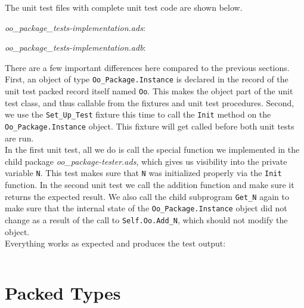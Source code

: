The unit test files with complete unit test code are shown below.

\textit{oo\_package\_tests-implementation.ads}:


\textit{oo\_package\_tests-implementation.adb}:


There are a few important differences here compared to the previous sections. First, an object of type \texttt{Oo\_Package.Instance} is declared in the record of the unit test packed record itself named \texttt{Oo}. This makes the object part of the unit test class, and thus callable from the fixtures and unit test procedures. Second, we use the \texttt{Set\_Up\_Test} fixture this time to call the \texttt{Init} method on the \texttt{Oo\_Package.Instance} object. This fixture will get called before both unit tests are run. \\

In the first unit test, all we do is call the special function we implemented in the child package \textit{oo\_package-tester.ads}, which gives us visibility into the private variable \texttt{N}. This test makes sure that \texttt{N} was initialized properly via the \texttt{Init} function. In the second unit test we call the addition function and make sure it returns the expected result. We also call the child subprogram \texttt{Get\_N} again to make sure that the internal state of the \texttt{Oo\_Package.Instance} object did not change as a result of the call to \texttt{Self.Oo.Add\_N}, which should not modify the object. \\

Everything works as expected and produces the test output:

\vspace{5mm} %
\inputminted{text}{ ../example_architecture/oo_package/test/output.txt}
\vspace{5mm} %

\newpage
\section{Packed Types} \label{Packed Types}

